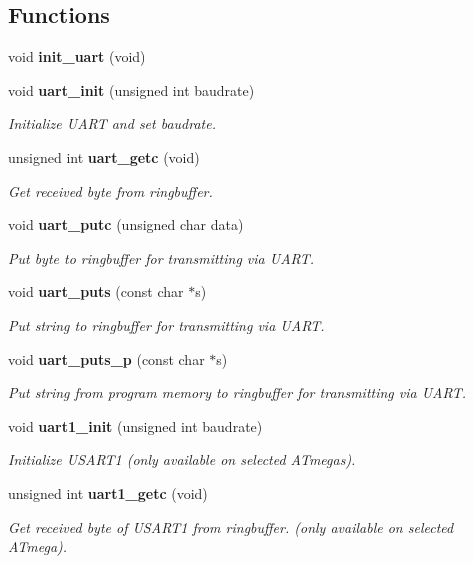 \subsection*{Functions}
\begin{CompactItemize}
\item 
void {\bf init\_\-uart} (void)
\item 
void {\bf uart\_\-init} (unsigned int baudrate)
\begin{CompactList}\small\item\em Initialize UART and set baudrate. \item\end{CompactList}\item 
unsigned int {\bf uart\_\-getc} (void)
\begin{CompactList}\small\item\em Get received byte from ringbuffer. \item\end{CompactList}\item 
void {\bf uart\_\-putc} (unsigned char data)
\begin{CompactList}\small\item\em Put byte to ringbuffer for transmitting via UART. \item\end{CompactList}\item 
void {\bf uart\_\-puts} (const char $\ast$s)
\begin{CompactList}\small\item\em Put string to ringbuffer for transmitting via UART. \item\end{CompactList}\item 
void {\bf uart\_\-puts\_\-p} (const char $\ast$s)
\begin{CompactList}\small\item\em Put string from program memory to ringbuffer for transmitting via UART. \item\end{CompactList}\item 
void {\bf uart1\_\-init} (unsigned int baudrate)
\begin{CompactList}\small\item\em Initialize USART1 (only available on selected ATmegas). \item\end{CompactList}\item 
unsigned int {\bf uart1\_\-getc} (void)
\begin{CompactList}\small\item\em Get received byte of USART1 from ringbuffer. (only available on selected ATmega). \item\end{CompactList}\item 

\end{CompactItemize}
